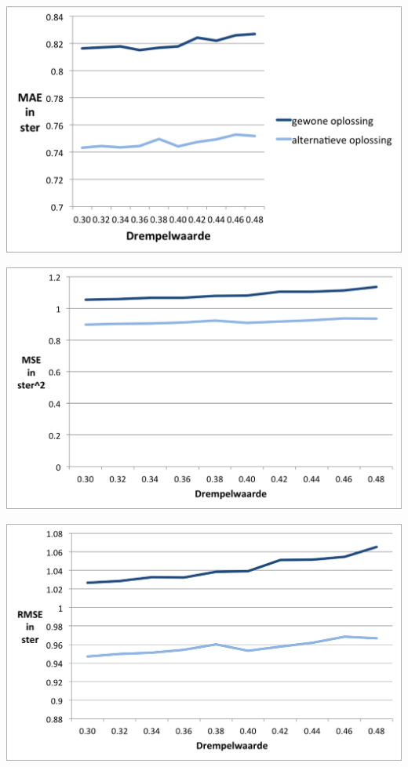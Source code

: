 \begin{center} 
\centering 
\includegraphics[scale=0.6]{fig/mae}       
\label{Figuur::mae} 
\end{center}
\begin{center} 
\centering 
\includegraphics[scale=0.6]{fig/mse}  
    \label{Figuur::mse} 
\end{center}
\begin{center} 
\centering 
 \includegraphics[scale=0.6]{fig/rmse} 
    \label{Figuur::rmse}  
\end{center}

